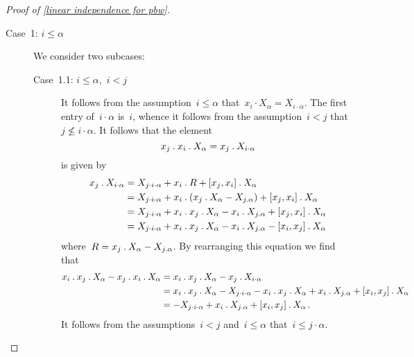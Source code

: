 \begin{proof}[Proof of \cref{linear independence for pbw}]
  \begin{description}
    \item[Case~1: $i \leq \alpha$]
      We consider two subcases:
      \begin{description}
        \item[Case~1.1: $i \leq \alpha$,~$i < j$]
          It follows from the assumption~$i \leq \alpha$ that~$x_i \cdot X_\alpha = X_{i \cdot \alpha}$.
          The first entry of~$i \cdot \alpha$ is~$i$, whence it follows from the assumption~$i < j$ that~$j \nleq i \cdot \alpha$.
          It follows that the element
          \[
            x_j \mathbin{.} x_i \mathbin{.} X_\alpha
            =
            x_j \mathbin{.} X_{i \cdot \alpha}
          \]
          is given by
          \begin{align*}
            x_j \mathbin{.} X_{i \cdot \alpha}
            &=
            X_{j \cdot i \cdot \alpha}
            + x_i \mathbin{.} R
            + [x_j, x_i] \mathbin{.} X_\alpha
            \\
            &=
            X_{j \cdot i \cdot \alpha}
            + x_i \mathbin{.} ( x_j \mathbin{.} X_\alpha - X_{j \mathbin{.} \alpha} )
            + [x_j, x_i] \mathbin{.} X_\alpha
            \\
            &=
            X_{j \cdot i \cdot \alpha}
            + x_i \mathbin{.} x_j \mathbin{.} X_\alpha
            - x_i \mathbin{.} X_{j \mathbin{.} \alpha}
            + [x_j, x_i] \mathbin{.} X_\alpha
            \\
            &=
            X_{j \cdot i \cdot \alpha}
            + x_i \mathbin{.} x_j \mathbin{.} X_\alpha
            - x_i \mathbin{.} X_{j \mathbin{.} \alpha}
            - [x_i, x_j] \mathbin{.} X_\alpha
          \end{align*}
          where~$R = x_j \mathbin{.} X_\alpha - X_{j \mathbin{.} \alpha}$.
          By rearranging this equation we find that
          \begin{align*}
            x_i \mathbin{.} x_j \mathbin{.} X_\alpha - x_j \mathbin{.} x_i \mathbin{.} X_\alpha
            &=
            x_i \mathbin{.} x_j \mathbin{.} X_\alpha - x_j \mathbin{.} X_{i \cdot \alpha}
            \\
            &=
            x_i \mathbin{.} x_j \mathbin{.} X_\alpha
            - X_{j \cdot i \cdot \alpha}
            - x_i \mathbin{.} x_j \mathbin{.} X_\alpha
            + x_i \mathbin{.} X_{j \mathbin{.} \alpha}
            + [x_i, x_j] \mathbin{.} X_\alpha
            \\
            &=
            - X_{j \cdot i \cdot \alpha}
            + x_i \mathbin{.} X_{j \mathbin{.} \alpha}
            + [x_i, x_j] \mathbin{.} X_\alpha \,.
          \end{align*}
          It follows from the assumptions~$i < j$ and~$i \leq \alpha$ that~$i \leq j \cdot \alpha$.

\end{description}
\end{description}
\end{proof}

